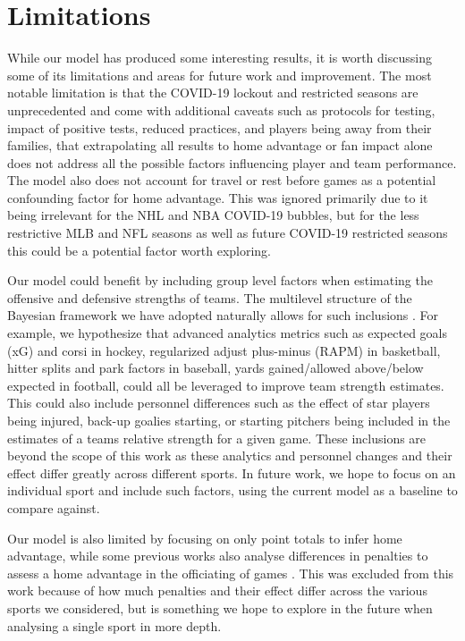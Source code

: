 \section*{Limitations}

While our model has produced some interesting results, it is worth discussing some of its limitations and areas for future work and improvement. The most notable limitation is that the COVID-19 lockout and restricted seasons are unprecedented and come with additional caveats such as protocols for testing, impact of positive tests, reduced practices, and players being away from their families, that extrapolating all results to home advantage or fan impact alone does not address all the possible factors influencing player and team performance. The model also does not account for travel or rest before games as a potential confounding factor for home advantage. This was ignored primarily due to it being irrelevant for the NHL and NBA COVID-19 bubbles, but for the less restrictive MLB and NFL seasons as well as future COVID-19 restricted seasons this could be a potential factor worth exploring.

Our model could benefit by including group level factors when estimating the offensive and defensive strengths of teams. The multilevel structure of the Bayesian framework we have adopted naturally allows for such inclusions \cite{Gelman2006} \cite{Gelman2014} \cite{McElreath2020}. For example, we hypothesize that advanced analytics metrics such as expected goals (xG) and corsi in hockey, regularized adjust plus-minus (RAPM) in basketball, hitter splits and park factors in baseball, yards gained/allowed above/below expected in football, could all be leveraged to improve team strength estimates. This could also include personnel differences such as the effect of star players being injured, back-up goalies starting, or starting pitchers being included in the estimates of a teams relative strength for a given game. These inclusions are beyond the scope of this work as these analytics and personnel changes and their effect differ greatly across different sports. In future work, we hope to focus on an individual sport and include such factors, using the current model as a baseline to compare against.

Our model is also limited by focusing on only point totals to infer home advantage, while some previous works also analyse differences in penalties to assess a home advantage in the officiating of games \cite{Benz2020} \cite{Unkelbach2010} \cite{Buraimo2010} \cite{Dohmen2016}. This was excluded from this work because of how much penalties and their effect differ across the various sports we considered, but is something we hope to explore in the future when analysing a single sport in more depth.

